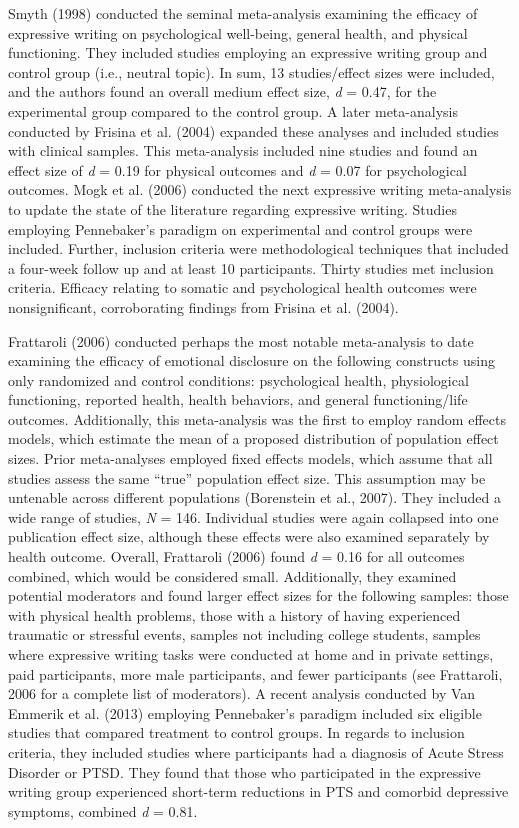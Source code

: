 \documentclass[man]{apa6}
\newcounter{author}
\theoremstyle{definition}
\theoremstyle{definition}
\theoremstyle{definition}
\theoremstyle{remark}
\begin{document}
Smyth (1998) conducted the seminal meta-analysis examining the efficacy
of expressive writing on psychological well-being, general health, and
physical functioning. They included studies employing an expressive
writing group and control group (i.e., neutral topic). In sum, 13
studies/effect sizes were included, and the authors found an overall
medium effect size, \emph{d} = 0.47, for the experimental group compared
to the control group. A later meta-analysis conducted by Frisina et al.
(2004) expanded these analyses and included studies with clinical
samples. This meta-analysis included nine studies and found an effect
size of \emph{d} = 0.19 for physical outcomes and \emph{d} = 0.07 for
psychological outcomes. Mogk et al. (2006) conducted the next expressive
writing meta-analysis to update the state of the literature regarding
expressive writing. Studies employing Pennebaker's paradigm on
experimental and control groups were included. Further, inclusion
criteria were methodological techniques that included a four-week follow
up and at least 10 participants. Thirty studies met inclusion criteria.
Efficacy relating to somatic and psychological health outcomes were
nonsignificant, corroborating findings from Frisina et al. (2004).

Frattaroli (2006) conducted perhaps the most notable meta-analysis to
date examining the efficacy of emotional disclosure on the following
constructs using only randomized and control conditions: psychological
health, physiological functioning, reported health, health behaviors,
and general functioning/life outcomes. Additionally, this meta-analysis
was the first to employ random effects models, which estimate the mean
of a proposed distribution of population effect sizes. Prior
meta-analyses employed fixed effects models, which assume that all
studies assess the same \enquote{true} population effect size. This
assumption may be untenable across different populations (Borenstein et
al., 2007). They included a wide range of studies, \emph{N} = 146.
Individual studies were again collapsed into one publication effect
size, although these effects were also examined separately by health
outcome. Overall, Frattaroli (2006) found \emph{d} = 0.16 for all
outcomes combined, which would be considered small. Additionally, they
examined potential moderators and found larger effect sizes for the
following samples: those with physical health problems, those with a
history of having experienced traumatic or stressful events, samples not
including college students, samples where expressive writing tasks were
conducted at home and in private settings, paid participants, more male
participants, and fewer participants (see Frattaroli, 2006 for a
complete list of moderators). A recent analysis conducted by Van Emmerik
et al. (2013) employing Pennebaker's paradigm included six eligible
studies that compared treatment to control groups. In regards to
inclusion criteria, they included studies where participants had a
diagnosis of Acute Stress Disorder or PTSD. They found that those who
participated in the expressive writing group experienced short-term
reductions in PTS and comorbid depressive symptoms, combined \emph{d} =
0.81.
\end{document}
